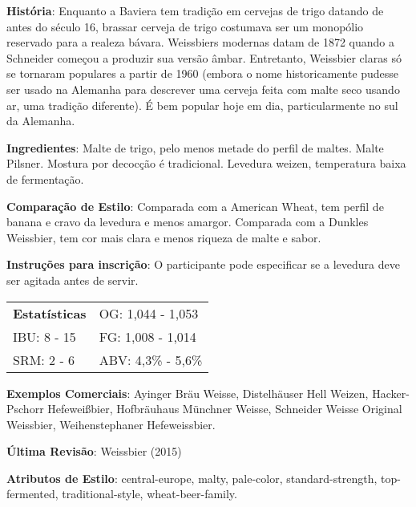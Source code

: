 \textbf{História}: Enquanto a Baviera tem tradição em cervejas de trigo datando de antes do século 16, brassar cerveja de trigo costumava ser um monopólio reservado para a realeza bávara. Weissbiers modernas datam de 1872 quando a Schneider começou a produzir sua versão âmbar. Entretanto, Weissbier claras só se tornaram populares a partir de 1960 (embora o nome historicamente pudesse ser usado na Alemanha para descrever uma cerveja feita com malte seco usando ar, uma tradição diferente). É bem popular hoje em dia, particularmente no sul da Alemanha.

\textbf{Ingredientes}: Malte de trigo, pelo menos metade do perfil de maltes. Malte Pilsner. Mostura por decocção é tradicional. Levedura weizen, temperatura baixa de fermentação.

\textbf{Comparação de Estilo}: Comparada com a American Wheat, tem perfil de banana e cravo da levedura e menos amargor. Comparada com a Dunkles Weissbier, tem cor mais clara e menos riqueza de malte e sabor.

\textbf{Instruções para inscrição}: O participante pode especificar se a levedura deve ser agitada antes de servir.

\begin{tabular}{@{}p{35mm}p{35mm}@{}}
  \textbf{Estatísticas} & OG: 1,044 - 1,053 \\
  IBU: 8 - 15 & FG: 1,008 - 1,014 \\
  SRM: 2 - 6 & ABV: 4,3\% - 5,6\%
\end{tabular}

\textbf{Exemplos Comerciais}: Ayinger Bräu Weisse, Distelhäuser Hell Weizen, Hacker-Pschorr Hefeweißbier, Hofbräuhaus Münchner Weisse, Schneider Weisse Original Weissbier, Weihenstephaner Hefeweissbier.

\textbf{Última Revisão}: Weissbier (2015)

\textbf{Atributos de Estilo}: central-europe, malty, pale-color, standard-strength, top-fermented, traditional-style, wheat-beer-family.
